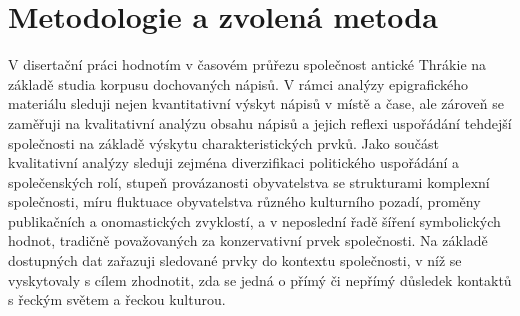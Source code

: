 
\chapter{Metodologie a zvolená metoda}
V disertační práci hodnotím v časovém průřezu společnost antické Thrákie na základě studia korpusu dochovaných nápisů. V rámci analýzy epigrafického materiálu sleduji nejen kvantitativní výskyt nápisů v místě a čase, ale zároveň se zaměřuji na kvalitativní analýzu obsahu nápisů a jejich reflexi uspořádání tehdejší společnosti na základě výskytu charakteristických prvků. Jako součást kvalitativní analýzy sleduji zejména diverzifikaci politického uspořádání a společenských rolí, stupeň provázanosti obyvatelstva se strukturami komplexní společnosti, míru fluktuace obyvatelstva různého kulturního pozadí, proměny publikačních a onomastických zvyklostí, a v neposlední řadě šíření symbolických hodnot, tradičně považovaných za konzervativní prvek společnosti. Na základě dostupných dat zařazuji sledované prvky do kontextu společnosti, v níž se vyskytovaly s cílem zhodnotit, zda se jedná o přímý či nepřímý důsledek kontaktů s řeckým světem a řeckou kulturou.


